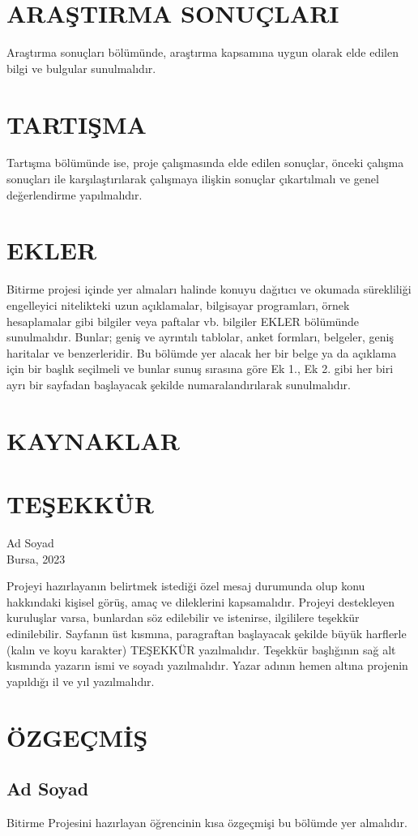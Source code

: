 \documentclass[hidelinks,12pt]{article}
\begin{document}
\section{ARAŞTIRMA SONUÇLARI}

Araştırma sonuçları bölümünde, araştırma kapsamına uygun
olarak elde edilen bilgi ve bulgular sunulmalıdır.
\newpage

\section{TARTIŞMA}

Tartışma bölümünde ise, proje
çalışmasında elde edilen sonuçlar, önceki çalışma sonuçları ile karşılaştırılarak
çalışmaya ilişkin sonuçlar çıkartılmalı ve genel değerlendirme yapılmalıdır.
\newpage

\section{EKLER}
Bitirme
projesi içinde yer almaları halinde konuyu dağıtıcı ve okumada sürekliliği engelleyici
nitelikteki uzun açıklamalar, bilgisayar programları, örnek hesaplamalar gibi bilgiler
veya paftalar vb. bilgiler EKLER bölümünde sunulmalıdır. Bunlar; geniş ve ayrıntılı
tablolar, anket formları, belgeler, geniş haritalar ve benzerleridir. Bu bölümde yer
alacak her bir belge ya da açıklama için bir başlık seçilmeli ve bunlar sunuş sırasına
göre Ek 1., Ek 2. gibi her biri ayrı bir sayfadan başlayacak şekilde numaralandırılarak
sunulmalıdır.
\newpage

\newpage
\section{KAYNAKLAR}
\printbibliography[heading=none]

\newpage

\section{TEŞEKKÜR}

\begin{flushright}
    Ad Soyad\\
    Bursa, 2023
\end{flushright}

Projeyi hazırlayanın belirtmek istediği özel mesaj durumunda olup konu
hakkındaki kişisel görüş, amaç ve dileklerini kapsamalıdır. Projeyi destekleyen
kuruluşlar varsa, bunlardan söz edilebilir ve istenirse, ilgililere teşekkür edinilebilir.
Sayfanın üst kısmına, paragraftan başlayacak şekilde büyük harflerle (kalın ve koyu
karakter) TEŞEKKÜR yazılmalıdır. Teşekkür başlığının sağ alt kısmında yazarın ismi
ve soyadı yazılmalıdır. Yazar adının hemen altına projenin yapıldığı il ve yıl
yazılmalıdır.
\newpage

\section{ÖZGEÇMİŞ}

\subsection{Ad Soyad}
Bitirme Projesini hazırlayan öğrencinin kısa özgeçmişi bu bölümde yer almalıdır.
\end{document}
